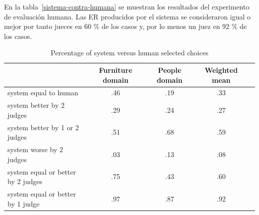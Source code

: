 En la tabla~\ref{sistema-contra-humana} se muestran los resultados del experimento de evaluaci\'on humana.
Las ER producidos por el sistema se consideraron igual o mejor por tanto
jueces en 60 \% de los casos y, por lo menos un juez en 92 \% de los casos.

\begin{table}[h!]
\begin{center}
\begin{tabular}{|l|c|c|c|c|}
\hline
 & Furniture domain & People domain & Weighted mean \\
\hline
system equal to human  	&	.46	&	.19	&	.33 \\
system better by 2 judges &	.29 	& 	.24 	& 	.27 \\
system better by 1 or 2 judges & .51	&	.68	&	.59 \\
system worse by 2 judges &	.03	&	.13	&	.08 \\
system equal or better by 2 judges  &.75  &       .43	&       .60 \\
system equal or better by 1 judge  &.97	&	.87	&	.92 \\
\hline
\end{tabular}
\caption{Percentage of system versus human selected choices} 
\label{system-versus-human}
\vspace*{-.5cm}
\end{center}
\end{table}



